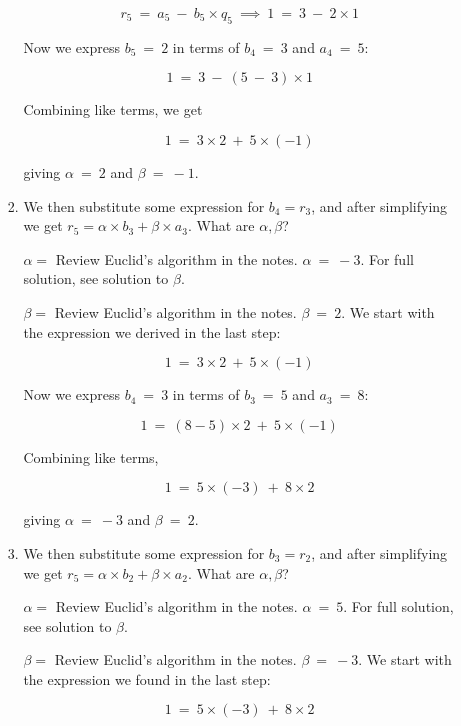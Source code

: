 \documentclass[11pt, preview]{standalone} %
\begin{document}
\begin{enumerate}
\begin{enumerate}
\begin{enumerate}
\begin{Freeform}{-1}
$$r_5\ =\ a_5\ -\ b_5 \times q_5\ \implies\ 1\ =\ 3\ -\ 2 \times 1$$

Now we express $b_5\ =\ 2$ in terms of $b_4\ =\ 3$ and $a_4\ =\ 5$:

$$1\ =\ 3\ -\ (5\ -\ 3) \times 1$$

Combining like terms, we get 

$$1\ =\ 3 \times 2\ +\ 5 \times (-1)$$

giving $\alpha\ =\ 2$ and $\beta\ =\ -1$.

\end{Freeform}
\item We then substitute some expression for $b_4 = r_3$, and after simplifying we get $r_5 = \alpha \times b_3 + \beta\times a_3$. What are $\alpha, \beta$?
\begin{Freeform}{-3}
$\alpha = $
\Hint Review Euclid's algorithm in the notes.
\Solution $\alpha\ =\ -3$. For full solution, see solution to $\beta$.
\end{Freeform}
\begin{Freeform}{2}
$\beta = $
\Hint Review Euclid's algorithm in the notes.
\Solution $\beta\ =\ 2$. We start with the expression we derived in the last step:

$$1\ =\ 3 \times 2\ +\ 5 \times (-1)$$

Now we express $b_4\ =\ 3$ in terms of $b_3\ =\ 5$ and $a_3\ =\ 8$:

$$1\ =\ (8 - 5) \times 2\ +\ 5 \times (-1)$$

Combining like terms, 

$$1\ =\ 5 \times (-3)\ +\ 8 \times 2$$

giving $\alpha\ =\ -3$ and $\beta\ =\ 2$.
\end{Freeform}
\item We then substitute some expression for $b_3 = r_2$, and after simplifying we get $r_5 = \alpha \times b_2 + \beta\times a_2$. What are $\alpha, \beta$?
\begin{Freeform}{5}
$\alpha = $
\Hint Review Euclid's algorithm in the notes.
\Solution $\alpha\ =\ 5$. For full solution, see solution to $\beta$.
\end{Freeform}
\begin{Freeform}{-3}
$\beta = $
\Hint Review Euclid's algorithm in the notes.
\Solution $\beta\ =\ -3$. We start with the expression we found in the last step:

$$1\ =\ 5 \times (-3)\ +\ 8 \times 2$$


\end{Freeform}
\end{enumerate}
\end{enumerate}
\end{enumerate}
\end{document}
